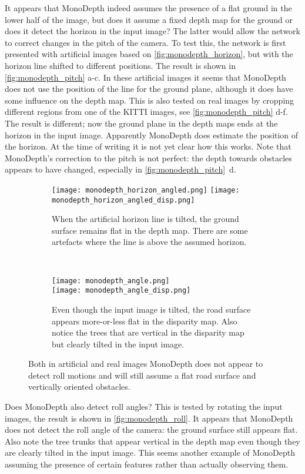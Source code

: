 It appears that MonoDepth indeed assumes the presence of a flat ground in the lower half of the image, but does it assume a fixed depth map for the ground or does it detect the horizon in the input image?
The latter would allow the network to correct changes in the pitch of the camera.
To test this, the network is first presented with artificial images based on \autoref{fig:monodepth_horizon}, but with the horizon line shifted to different positions.
The result is shown in \autoref{fig:monodepth_pitch} a-c.
In these artificial images it seems that MonoDepth does not use the position of the line for the ground plane, although it does have some influence on the depth map.
This is also tested on real images by cropping different regions from one of the KITTI images, see \autoref{fig:monodepth_pitch} d-f.
The result is different; now the ground plane in the depth maps ends at the horizon in the input image.
Apparently MonoDepth does estimate the position of the horizon.
At the time of writing it is not yet clear how this works.
Note that MonoDepth's correction to the pitch is not perfect: the depth towards obstacles appears to have changed, especially in \autoref{fig:monodepth_pitch}~d.

\begin{figure}
\centering
\begin{subfigure}[t]{0.45\textwidth}
\texttt{[image: monodepth\_horizon\_angled.png]}
\texttt{[image: monodepth\_horizon\_angled\_disp.png]}
\caption{When the artificial horizon line is tilted, the ground surface remains flat in the depth map. There are some artefacts where the line is above the assumed horizon.}
\end{subfigure}
~
\begin{subfigure}[t]{0.45\textwidth}
\texttt{[image: monodepth\_angle.png]}\\
\texttt{[image: monodepth\_angle\_disp.png]}
\caption{Even though the input image is tilted, the road surface appears more-or-less flat in the disparity map. Also notice the trees that are vertical in the disparity map but clearly tilted in the input image.}
\end{subfigure}
\caption{Both in artificial and real images MonoDepth does not appear to detect roll motions and will still assume a flat road surface and vertically oriented obstacles.}
\label{fig:monodepth_roll}
\end{figure}

Does MonoDepth also detect roll angles?
This is tested by rotating the input images, the result is shown in \autoref{fig:monodepth_roll}.
It appears that MonoDepth does not detect the roll angle of the camera: the ground surface still appears flat.
Also note the tree trunks that appear vertical in the depth map even though they are clearly tilted in the input image.
This seems another example of MonoDepth assuming the presence of certain features rather than actually observing them.

